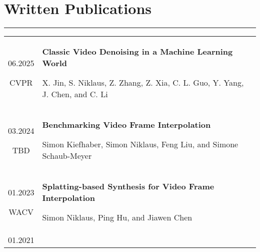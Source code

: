 \documentclass[10pt]{article}
\begin{document}
\section*{Written Publications}
\vspace{-0.3cm}
{\color{E6E6E6} \hrule height 0.04cm}
\vspace{0.4cm}
\renewcommand{\arraystretch}{1.0}
\begin{tabular}{C Z D}
	{
		06.2025
		
		\vspace{-0.05cm}
		
		{\scriptsize CVPR}
	}
	&
	{
		{\bf Classic Video Denoising in a Machine Learning World}
		
		\vspace{0.00cm}
		
		{\scriptsize X. Jin, S. Niklaus, Z. Zhang, Z. Xia, C. L. Guo, Y. Yang, J. Chen, and C. Li}
		
%		
		
		\vspace{0.0cm}
	}
	\\
	{
		03.2024
		
		\vspace{-0.05cm}
		
		{\scriptsize TBD}
	}
	&
	{
		{\bf Benchmarking Video Frame Interpolation}
		
		\vspace{0.00cm}
		
		{\scriptsize Simon Kiefhaber, Simon Niklaus, Feng Liu, and Simone Schaub-Meyer}
		
		\vspace{0.0cm}
	}
	\\
	{
		01.2023
		
		\vspace{-0.05cm}
		
		{\scriptsize WACV}
	}
	&
	{
		{\bf Splatting-based Synthesis for Video Frame Interpolation}
		
		\vspace{0.00cm}
		
		{\scriptsize Simon Niklaus, Ping Hu, and Jiawen Chen}
		
%		
		
		\vspace{0.0cm}
	}
	\\
	{
		01.2021
		
}
\end{tabular}
\end{document}
